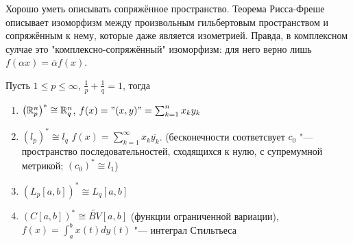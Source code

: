 \documentclass[main]{subfiles}
\begin{document}
Хорошо уметь описывать сопряжённое пространство. Теорема Рисса-Фреше
описывает изоморфизм между произвольным гильбертовым пространством
и сопряжённым к нему, которые даже является изометрией.
Правда, в комплексном сулчае это "комплексно-сопряжённый" изоморфизм:
для него верно лишь $f(\alpha x) = \overline{\alpha} f(x)$.

\begin{exercise}
  Пусть $1 \le p \le \infty$, $\frac{1}{p} + \frac{1}{q} = 1$, тогда
  \begin{enumerate}
    \item $\left(\mathbb{R}^n_p\right)^* \cong \mathbb{R}^n_q$,
      $f(x) = "(x, y)" = \sum_{k=1}^n x_k y_k$
    \item $(l_p)^* \cong l_q$
      $f(x) = \sum_{k = 1}^\infty x_k \overline{y_k}$.
      (бесконечности соответсвует $c_0$ "--- пространство
      последовательностей, сходящихся к нулю, с супремумной метрикой;
      $(c_0)^* \cong l_1$)
    \item $\left( L_p[a, b] \right)^* \cong L_q[a, b]$
    \item $\left( C[a,b] \right)^* \cong \widetilde{BV}[a,b]$
      (функции ограниченной вариации), $f(x) = \int_a^b x(t) dy(t)$ "---
      интеграл Стильтьеса
  \end{enumerate}
\end{exercise}
\end{document}
